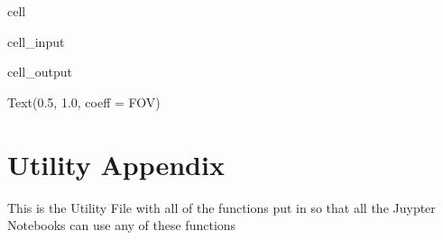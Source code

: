 \documentclass[letterpaper,10pt,english]{jupyterBook}
\begin{document}
\begin{sphinxuseclass}{cell}\begin{sphinxVerbatimInput}

\begin{sphinxuseclass}{cell_input}
\begin{sphinxVerbatim}[commandchars=\\\{\}]
\end{sphinxVerbatim}

\end{sphinxuseclass}\end{sphinxVerbatimInput}
\begin{sphinxVerbatimOutput}

\begin{sphinxuseclass}{cell_output}
\begin{sphinxVerbatim}[commandchars=\\\{\}]
Text(0.5, 1.0, \PYGZsq{}coeff = FOV\PYGZsq{})
\end{sphinxVerbatim}

\noindent{}

\end{sphinxuseclass}\end{sphinxVerbatimOutput}

\end{sphinxuseclass}
\sphinxstepscope


\chapter{Utility Appendix}
\label{\detokenize{utility:utility-appendix}}\label{\detokenize{utility::doc}}
\sphinxAtStartPar
This is the Utility File with all of the functions put in so that all the Juypter Notebooks can use any of these functions
\end{document}
